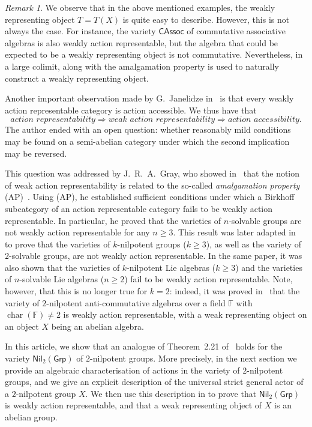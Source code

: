 \documentclass[reqno,hidelinks,a4paper]{amsart}
\theoremstyle{plain}
\theoremstyle{definition}
\theoremstyle{remark}
\newtheorem{remark}[subsection]{Remark}
\numberwithin{equation}{section}
\newcommand{\F}{\mathbb{F}}
\DeclareMathOperator{\bchar}{char}
\newcommand{\Grp}{\ensuremath{\mathsf{Grp}}}
\newcommand{\CAssoc}{\ensuremath{\mathsf{CAssoc}}}
\newcommand{\Nil}{\ensuremath{\mathsf{Nil}}}
\begin{document}
\begin{remark}
    We observe that in the above mentioned examples, the weakly representing object \(T=T(X)\) is quite easy to describe. However, this is not always the case. For instance, the variety \(\CAssoc\) of commutative associative algebras is also weakly action representable, but the algebra that could be expected to be a weakly representing object is not commutative. Nevertheless, in~\cite{WRAAlg} a large colimit, along with the amalgamation property is used to naturally construct a weakly representing object.
\end{remark}

Another important observation made by G.~Janelidze in~\cite{WRA} is that every weakly action representable category is action accessible. We thus have that
\[
    \textit{action representability}\Rightarrow\textit{weak action representability}\Rightarrow\textit{action accessibility.}
\]
The author ended with an open question: whether reasonably mild conditions may be found on a semi-abelian category under which the second implication may be reversed.

This question was addressed by J.~R.~A.\ Gray, who showed in~\cite{Gray} that the notion of weak action representability is related to the so-called \emph{amalgamation property} (AP)~\cite{kiss}. Using (AP), he established sufficient conditions under which a Birkhoff subcategory of an action representable category fails to be weakly action representable. In particular, he proved that the varieties of \(n\)-solvable groups are not weakly action representable for any \(n \geq 3\). This result was later adapted in~\cite{XabiMancini} to prove that the varieties of \(k\)-nilpotent groups (\(k \geq 3\)), as well as the variety of \(2\)-solvable groups, are not weakly action representable. In the same paper, it was also shown that the varieties of \(k\)-nilpotent Lie algebras (\(k \geq 3\)) and the varieties of \(n\)-solvable Lie algebras (\(n \geq 2\)) fail to be weakly action representable. Note, however, that this is no longer true for \(k=2\): indeed, it was proved in~\cite[Theorem~2.21]{WRAAlg} that the variety of \(2\)-nilpotent anti-commutative algebras over a field \(\F\) with \(\bchar(\F)\neq 2\) is weakly action representable, with a weak representing object on an object \(X\) being an abelian algebra.

In this article, we show that an analogue of Theorem~2.21 of~\cite{WRAAlg} holds for the variety \(\Nil_2(\Grp)\) of \(2\)-nilpotent groups. More precisely, in the next section we provide an algebraic characterisation of actions in the variety of \(2\)-nilpotent groups, and we give an explicit description of the universal strict general actor of a \(2\)-nilpotent group \(X\). We then use this description in  to prove that \(\Nil_2(\Grp)\) is weakly action representable, and that a weak representing object of \(X\) is an abelian group.
\end{document}
